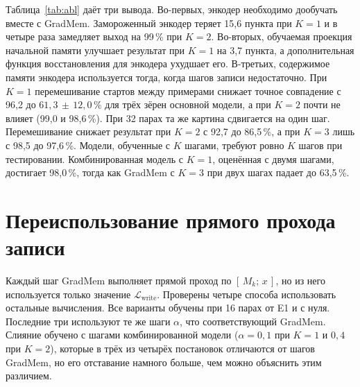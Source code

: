 \documentclass[a4paper,11pt]{article}
\newcommand{\pmm}{\ensuremath{\,\pm\,}}
\newcommand{\cm}{\mathcal{L}}
\begin{document}
\begin{table}[t]
\centering\footnotesize
\caption{Абляции комбинированной модели, 16 пар, одно зерно. Exact match на тесте в процентах. Перемешанный старт означает, что каждый пример получает память энкодера от другого примера.}
\label{tab:abl}
\end{table}

Таблица~\ref{tab:abl} даёт три вывода. Во-первых, энкодер необходимо дообучать вместе с GradMem. Замороженный энкодер теряет 15,6 пункта при $K=1$ и в четыре раза замедляет выход на 99\,\% при $K=2$. Во-вторых, обучаемая проекция начальной памяти улучшает результат при $K=1$ на 3,7 пункта, а дополнительная функция восстановления для энкодера ухудшает его. В-третьих, содержимое памяти энкодера используется тогда, когда шагов записи недостаточно. При $K=1$ перемешивание стартов между примерами снижает точное совпадение с 96,2 до $61{,}3\pmm12{,}0\,\%$ для трёх зёрен основной модели, а при $K=2$ почти не влияет (99,0 и 98,6\,\%). При 32 парах та же картина сдвигается на один шаг. Перемешивание снижает результат при $K=2$ с 92,7 до 86,5\,\%, а при $K=3$ лишь с 98,5 до 97,6\,\%. Модели, обученные с $K$ шагами, требуют ровно $K$ шагов при тестировании. Комбинированная модель с $K=1$, оценённая с двумя шагами, достигает 98,0\,\%, тогда как GradMem с $K=3$ при двух шагах падает до 63,5\,\%.

\section{Переиспользование прямого прохода записи}\label{sec:fwd}
Каждый шаг GradMem выполняет прямой проход по $[\,M_k;\,x\,]$, но из него используется только значение $\cm_{\text{write}}$. Проверены четыре способа использовать остальные вычисления. Все варианты обучены при 16 парах от E1 и с нуля. Последние три используют те же шаги $\alpha$, что соответствующий GradMem. Слияние обучено с шагами комбинированной модели ($\alpha=0{,}1$ при $K=1$ и $0{,}4$ при $K=2$), которые в трёх из четырёх постановок отличаются от шагов GradMem, но его отставание намного больше, чем можно объяснить этим различием.
\end{document}
